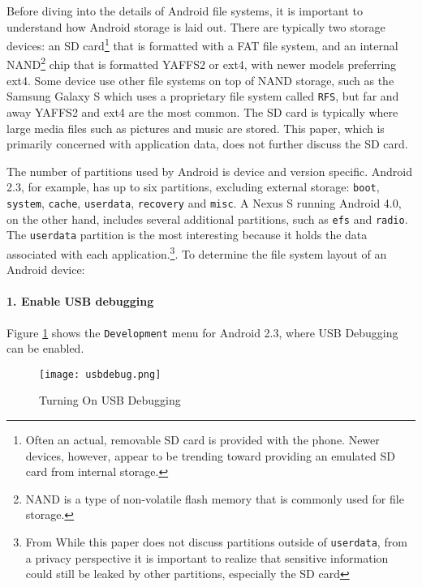 Before diving into the details of Android file systems, it is important to understand how Android storage is laid out.  There are
typically two storage devices: an SD card\footnote{Often an actual, removable SD card is provided with the phone. Newer devices,
however, appear to be trending toward providing an emulated SD card from internal storage.} that is formatted with a FAT file
system, and an internal NAND\footnote{NAND is a type of non-volatile flash memory that is commonly used for file storage.} chip that
is formatted YAFFS2 or ext4, with newer models preferring ext4. Some device use other file systems on top
of NAND storage, such as the Samsung Galaxy S which uses a proprietary file system called \texttt{RFS}, but far and away
YAFFS2 and ext4 are the most common. The SD card is typically where large media files such as pictures and music
are stored. This paper, which is primarily concerned with application data, does not further discuss the SD card.

The number of partitions used by Android is device and version specific.  Android 2.3, for example, has up to six partitions,
excluding external storage: \texttt{boot}, \texttt{system}, \texttt{cache}, \texttt{userdata}, \texttt{recovery} and \texttt{misc}.
A Nexus S running Android 4.0, on the other hand, includes several additional partitions, such as \texttt{efs} and \texttt{radio}.
The \texttt{userdata} partition is the most interesting because it holds the data associated with each application.\footnote{From
While this paper does not discuss partitions outside of \texttt{userdata}, from a privacy perspective it is important to realize
that sensitive information could still be leaked by other partitions, especially the SD card}. To determine the file system layout
of an Android device:

\paragraph {1. Enable USB debugging} 
Figure \ref{fig:usbdebug} shows the \texttt{Development} menu for Android 2.3, where USB Debugging can be
enabled.  
\begin{figure}[htb]
\begin{center}\texttt{[image: usbdebug.png]}\end{center}
\caption{Turning On USB Debugging}
\label{fig:usbdebug}
\end{figure}

